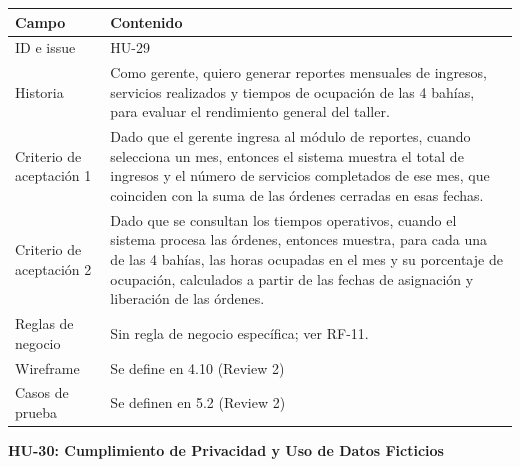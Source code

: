 {\def\LTcaptype{none} %
\begin{longtable}[]{@{}
  >{\raggedright\arraybackslash}p{}
  >{\raggedright\arraybackslash}p{}@{}}
\toprule\noalign{}
\begin{minipage}[b]{\linewidth}\raggedright
\textbf{Campo}
\end{minipage} & \begin{minipage}[b]{\linewidth}\raggedright
\textbf{Contenido}
\end{minipage} \\
\midrule\noalign{}
\endhead
\bottomrule\noalign{}
\endlastfoot
ID e issue & HU-29 \\
Historia & Como gerente, quiero generar reportes mensuales de ingresos,
servicios realizados y tiempos de ocupación de las 4 bahías, para
evaluar el rendimiento general del taller. \\
Criterio de aceptación 1 & Dado que el gerente ingresa al módulo de
reportes, cuando selecciona un mes, entonces el sistema muestra el
total de ingresos y el número de servicios completados de ese mes, que
coinciden con la suma de las órdenes cerradas en esas fechas. \\
Criterio de aceptación 2 & Dado que se consultan los tiempos operativos,
cuando el sistema procesa las órdenes, entonces muestra, para cada una
de las 4 bahías, las horas ocupadas en el mes y su porcentaje de
ocupación, calculados a partir de las fechas de asignación y liberación
de las órdenes. \\
Reglas de negocio & Sin regla de negocio específica; ver RF-11. \\
Wireframe & Se define en 4.10 (Review 2) \\
Casos de prueba & Se definen en 5.2 (Review 2) \\
\end{longtable}
}

\textbf{HU-30: Cumplimiento de Privacidad y Uso de Datos Ficticios}

